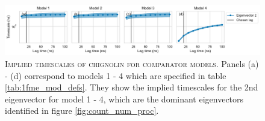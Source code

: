 \documentclass{article}
\begin{document}
\begin{figure}[h]
    \centering
    \includegraphics[width=1\textwidth]{figures/model_comparision_its/cln025.pdf}
    \caption{\textsc{Implied timescales of chignolin for comparator models.} Panels (a) - (d) correspond to models 1 - 4 which are specified in table \ref{tab:1fme_mod_defs}. They show the implied timescales for the 2nd eigenvector for model 1 - 4, which are the dominant eigenvectors identified in figure \ref{fig:count_num_proc}.}
    \label{fig:cln025_its}
\end{figure}
\end{document}
